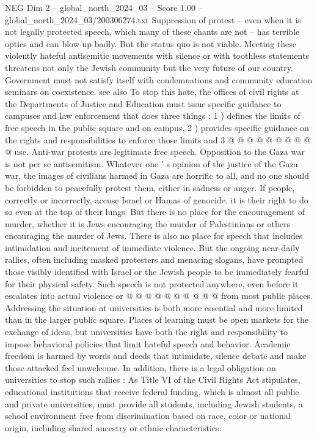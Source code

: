 \begin{textsample}{NEG Dim 2 – global\_north\_2024\_03 – Score 1.00 – global\_north\_2024\_03/200306274.txt}
Suppression of protest -- even when it is not legally protected speech, which many of these chants are not -- has terrible optics and can blow up badly.
But the status quo is not viable.
Meeting these violently hateful antisemitic movements with silence or with toothless statements threatens not only the Jewish community but the very future of our country.
Government must not satisfy itself with condemnations and community education seminars on coexistence. see also To stop this hate, the offices of civil rights at the Departments of Justice and Education must issue specific guidance to campuses and law enforcement that does three things : 1 ) defines the limits of free speech in the public square and on campus, 2 ) provides specific guidance on the rights and responsibilities to enforce those limits and 3 @ @ @ @ @ @ @ @ @ @ use.
Anti-war protests are legitimate free speech.
Opposition to the Gaza war is not per se antisemitism.
Whatever one ' s opinion of the justice of the Gaza war, the images of civilians harmed in Gaza are horrific to all, and no one should be forbidden to peacefully protest them, either in sadness or anger.
If people, correctly or incorrectly, accuse Israel or Hamas of genocide, it is their right to do so even at the top of their lungs.
But there is no place for the encouragement of murder, whether it is Jews encouraging the murder of Palestinians or others encouraging the murder of Jews.
There is also no place for speech that includes intimidation and incitement of immediate violence.
But the ongoing near-daily rallies, often including masked protesters and menacing slogans, have prompted those visibly identified with Israel or the Jewish people to be immediately fearful for their physical safety.
Such speech is not protected anywhere, even before it escalates into actual violence or @ @ @ @ @ @ @ @ @ @ from most public places.
Addressing the situation at universities is both more essential and more limited than in the larger public square.
Places of learning must be open markets for the exchange of ideas, but universities have both the right and responsibility to impose behavioral policies that limit hateful speech and behavior.
Academic freedom is harmed by words and deeds that intimidate, silence debate and make those attacked feel unwelcome.
In addition, there is a legal obligation on universities to stop such rallies : As Title VI of the Civil Rights Act stipulates, educational institutions that receive federal funding, which is almost all public and private universities, must provide all students, including Jewish students, a school environment free from discrimination based on race, color or national origin, including shared ancestry or ethnic characteristics.

\end{textsample}
